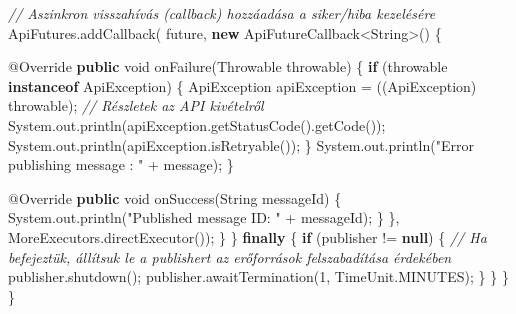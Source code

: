 \documentclass[
]{article}
\newenvironment{Shaded}{}{}
\newcommand{\AttributeTok}[1]{\textcolor[rgb]{0.49,0.56,0.16}{#1}}
\newcommand{\BuiltInTok}[1]{\textcolor[rgb]{0.00,0.50,0.00}{#1}}
\newcommand{\CommentTok}[1]{\textcolor[rgb]{0.38,0.63,0.69}{\textit{#1}}}
\newcommand{\ControlFlowTok}[1]{\textcolor[rgb]{0.00,0.44,0.13}{\textbf{#1}}}
\newcommand{\DataTypeTok}[1]{\textcolor[rgb]{0.56,0.13,0.00}{#1}}
\newcommand{\DecValTok}[1]{\textcolor[rgb]{0.25,0.63,0.44}{#1}}
\newcommand{\FunctionTok}[1]{\textcolor[rgb]{0.02,0.16,0.49}{#1}}
\newcommand{\KeywordTok}[1]{\textcolor[rgb]{0.00,0.44,0.13}{\textbf{#1}}}
\newcommand{\NormalTok}[1]{#1}
\newcommand{\OperatorTok}[1]{\textcolor[rgb]{0.40,0.40,0.40}{#1}}
\newcommand{\StringTok}[1]{\textcolor[rgb]{0.25,0.44,0.63}{#1}}
\begin{document}
\begin{Shaded}
\begin{Highlighting}[]
        \CommentTok{// Aszinkron visszahívás (callback) hozzáadása a siker/hiba kezelésére}
\NormalTok{        ApiFutures}\OperatorTok{.}\FunctionTok{addCallback}\OperatorTok{(}
\NormalTok{            future}\OperatorTok{,}
            \KeywordTok{new}\NormalTok{ ApiFutureCallback}\OperatorTok{\textless{}}\BuiltInTok{String}\OperatorTok{\textgreater{}()} \OperatorTok{\{}

              \AttributeTok{@Override}
              \KeywordTok{public} \DataTypeTok{void} \FunctionTok{onFailure}\OperatorTok{(}\BuiltInTok{Throwable}\NormalTok{ throwable}\OperatorTok{)} \OperatorTok{\{}
                \ControlFlowTok{if} \OperatorTok{(}\NormalTok{throwable }\KeywordTok{instanceof}\NormalTok{ ApiException}\OperatorTok{)} \OperatorTok{\{}
\NormalTok{                  ApiException apiException }\OperatorTok{=} \OperatorTok{((}\NormalTok{ApiException}\OperatorTok{)}\NormalTok{ throwable}\OperatorTok{);}
                  \CommentTok{// Részletek az API kivételről}
                  \BuiltInTok{System}\OperatorTok{.}\FunctionTok{out}\OperatorTok{.}\FunctionTok{println}\OperatorTok{(}\NormalTok{apiException}\OperatorTok{.}\FunctionTok{getStatusCode}\OperatorTok{().}\FunctionTok{getCode}\OperatorTok{());}
                  \BuiltInTok{System}\OperatorTok{.}\FunctionTok{out}\OperatorTok{.}\FunctionTok{println}\OperatorTok{(}\NormalTok{apiException}\OperatorTok{.}\FunctionTok{isRetryable}\OperatorTok{());}
                \OperatorTok{\}}
                \BuiltInTok{System}\OperatorTok{.}\FunctionTok{out}\OperatorTok{.}\FunctionTok{println}\OperatorTok{(}\StringTok{"Error publishing message : "} \OperatorTok{+}\NormalTok{ message}\OperatorTok{);}
              \OperatorTok{\}}

              \AttributeTok{@Override}
              \KeywordTok{public} \DataTypeTok{void} \FunctionTok{onSuccess}\OperatorTok{(}\BuiltInTok{String}\NormalTok{ messageId}\OperatorTok{)} \OperatorTok{\{}
                \BuiltInTok{System}\OperatorTok{.}\FunctionTok{out}\OperatorTok{.}\FunctionTok{println}\OperatorTok{(}\StringTok{"Published message ID: "} \OperatorTok{+}\NormalTok{ messageId}\OperatorTok{);}
              \OperatorTok{\}}
            \OperatorTok{\},}
\NormalTok{            MoreExecutors}\OperatorTok{.}\FunctionTok{directExecutor}\OperatorTok{());}
      \OperatorTok{\}}
    \OperatorTok{\}} \ControlFlowTok{finally} \OperatorTok{\{}
      \ControlFlowTok{if} \OperatorTok{(}\NormalTok{publisher }\OperatorTok{!=} \KeywordTok{null}\OperatorTok{)} \OperatorTok{\{}
        \CommentTok{// Ha befejeztük, állítsuk le a publishert az erőforrások felszabadítása érdekében}
\NormalTok{        publisher}\OperatorTok{.}\FunctionTok{shutdown}\OperatorTok{();}
\NormalTok{        publisher}\OperatorTok{.}\FunctionTok{awaitTermination}\OperatorTok{(}\DecValTok{1}\OperatorTok{,} \BuiltInTok{TimeUnit}\OperatorTok{.}\FunctionTok{MINUTES}\OperatorTok{);}
      \OperatorTok{\}}
    \OperatorTok{\}}
  \OperatorTok{\}}
\OperatorTok{\}}
\end{Highlighting}
\end{Shaded}
\end{document}
